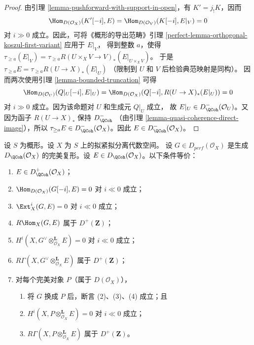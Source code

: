 \begin{proof}
\medskip\noindent
由引理 \ref{lemma-pushforward-with-support-in-open}，有
$K' =  j_!K$，因而
$$
\Hom_{D(\mathcal{O}_X)}(K'[-i], E) = \Hom_{D(\mathcal{O}_V)}(K[-i], E|_V) = 0
$$
对 $i \gg 0$ 成立。因此，可将《概形的导出范畴》引理
\ref{perfect-lemma-orthogonal-koszul-first-variant} 应用于 $E|_V$，
得到整数 $a$，使得
$\tau_{\geq a}(E|_V) =
\tau_{\geq a} R (U \times_X V \to V)_* (E|_{U \times_X V})$。
于是 $\tau_{\geq a} E = \tau_{\geq a} R (U \to X)_* (E |_U)$
（限制到 $U$ 和 $V$ 后检验典范映射是同构）。
因而两次使用引理 \ref{lemma-bounded-truncation} 可得
$$
\Hom_{D(\mathcal{O}_U)}(Q|_U [-i], E|_U) =
\Hom_{D(\mathcal{O}_X)}(Q[-i], R (U \to X)_* (E|_U)) = 0
$$
对 $i \gg 0$ 成立。因为该命题对 $U$ 和生成元 $Q|_U$ 成立，
故 $E|_U \in D^-_\QCoh(\mathcal{O}_U)$。又因为函子
$R (U \to X)_*$ 保持 $D^-_\QCoh$
（由引理 \ref{lemma-quasi-coherence-direct-image}），所以
$\tau_{\geq a}E \in D^-_\QCoh(\mathcal{O}_X)$。因此
$E \in D^-_\QCoh (\mathcal{O}_X)$。
\end{proof}

\begin{proposition}
\label{proposition-detecting-bounded-below}
设 $S$ 为概形。设 $X$ 为 $S$ 上的拟紧拟分离代数空间。
设 $G \in D_{perf}(\mathcal{O}_X)$ 是生成
$D_\QCoh (\mathcal{O}_X)$ 的完美复形。设
$E \in D_\QCoh (\mathcal{O}_X)$。以下条件等价：
\begin{enumerate}
\item $E \in D^+_\QCoh (\mathcal{O}_X)$；
\item $\Hom_{D(\mathcal{O}_X)}(G[-i], E) = 0$
对 $i \ll 0$ 成立；
\item $\Ext^i_X(G, E) = 0$ 对 $i \ll 0$ 成立；
\item $R\Hom_X(G, E)$ 属于 $D^+(\mathbf{Z})$；
\item $H^i(X, G^\vee \otimes_{\mathcal{O}_X}^\mathbf{L} E) = 0$
对 $i \ll 0$ 成立；
\item $R\Gamma(X, G^\vee \otimes_{\mathcal{O}_X}^\mathbf{L} E)$
属于 $D^+(\mathbf{Z})$；
\item 对每个完美对象 $P$（属于 $D(\mathcal{O}_X)$），
\begin{enumerate}
\item 将 $G$ 换成 $P$ 后，断言 (2)、(3)、(4) 成立；且
\item $H^i(X, P \otimes_{\mathcal{O}_X}^\mathbf{L} E) = 0$
对 $i \ll 0$ 成立；
\item $R\Gamma(X, P \otimes_{\mathcal{O}_X}^\mathbf{L} E)$
属于 $D^+(\mathbf{Z})$。
\end{enumerate}
\end{enumerate}
\end{proposition}

